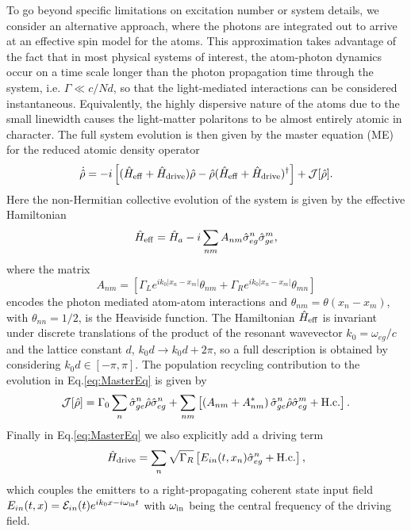 \documentclass[pra,twocolumn,showpacs,preprintnumbers,amsmath,amssymb]{revtex4-1}
\begin{document}
To go beyond specific limitations on excitation number or system details, we consider an alternative approach, where the photons are integrated out to arrive at an effective spin model for the atoms. This approximation takes advantage of the fact that in most physical systems of interest, the atom-photon dynamics occur on a time scale longer than the photon propagation time through the system, i.e. $\Gamma\ll c/Nd$, so that the light-mediated interactions can be considered instantaneous. Equivalently, the highly dispersive nature of the atoms due to the small linewidth causes the light-matter polaritons to be almost entirely atomic in character. The full system evolution is then given by the master equation (ME) for the reduced atomic density operator~\cite{Caneva, MPSJames,glauber} 
\begin{equation}\label{eq:MasterEq}
\dot{\hat \rho}= -i\left[ (\hat H_{\rm eff}+\hat H_{\rm drive})\hat \rho-\hat\rho (\hat H_{\rm eff}+\hat H_{\rm drive})^{\dagger}\right]+\mathcal{J}[\hat\rho].
\end{equation}
Here the non-Hermitian collective evolution
of the system is given by the effective Hamiltonian
\begin{equation}\label{Heff}
\hat H_{\rm eff}=\hat H_a-i\sum_{nm}A_{nm}\hat\sigma^n_{eg}\hat\sigma^m_{ge},
\end{equation}
where the matrix 
\begin{equation}
A_{nm}=\left[\Gamma_L e^{ik_0|x_n-x_m|}\theta_{nm}+\Gamma_R e^{ik_0|x_n-x_m|}\theta_{mn}\right]
\end{equation}
encodes the photon mediated atom-atom interactions and $\theta_{nm}=\theta(x_n-x_m)$, with $\theta_{nn}=1/2$, is the Heaviside function.  The Hamiltonian $\hat H_{\rm eff}$ is invariant 
under discrete translations of the product of the resonant wavevector $k_0=\omega_{eg}/c$ and the lattice constant $d$, $k_0 d \rightarrow k_0 d + 2\pi$, so a full description is obtained by considering $k_0d\in[-\pi,\pi]$.
The population recycling contribution to the evolution in Eq.\eqref{eq:MasterEq} is given by
 \begin{equation}
\mathcal{J}[\hat\rho]=\Gamma_0\sum_n\hat\sigma^{n}_{ge}\hat\rho \hat\sigma_{eg}^n+\sum_{nm}\left[\left(A_{nm}+A^*_{nm}\right)\hat\sigma^{n}_{ge}\hat\rho\hat\sigma_{eg}^m+\rm H.c.\right].
\end{equation}
Finally in Eq.\eqref{eq:MasterEq} we also explicitly add a driving term
\begin{equation}
\hat H_{\rm drive}=\sum_n\sqrt{\Gamma_R}\left[E_{in}(t,x_n)\hat\sigma_{eg}^n+ \rm H.c.\right],
\end{equation}
which couples the emitters to a right-propagating coherent state input field $E_{in}(t,x)=\mathcal{E}_{in}(t)e^{ik_{0} x-i\omega_{\rm in}t}$ with $\omega_{\rm in}$ being the central frequency of the driving field.\\
\end{document}
